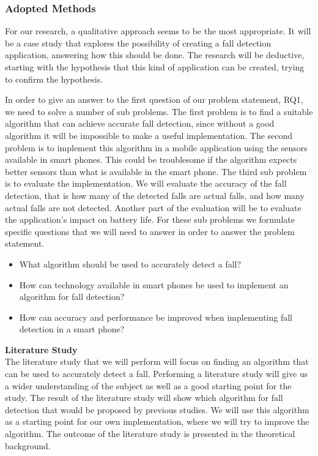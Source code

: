 \documentclass[12pt, a4paper, onecolumn]{article}
\newcommand{\parag}[1]{
	\textbf{#1} \hspace{0pt} \\
}
\begin{document}
	\subsubsection{Adopted Methods}
	
	For our research, a qualitative approach seems to be the most appropriate. It will be a case study that explores the possibility of creating a fall detection application, answering how this should be done. The research will be deductive, starting with the hypothesis that this kind of application can be created, trying to confirm the hypothesis. 
	
	In order to give an answer to the first question of our problem statement, RQ1, we need to solve a number of sub problems. The first problem is to find a suitable algorithm that can achieve accurate fall detection, since without a good algorithm it will be impossible to make a useful implementation. The second problem is to implement this algorithm in a mobile application using the sensors available in smart phones. This could be troublesome if the algorithm expects better sensors than what is available in the smart phone. The third sub problem is to evaluate the implementation. We will evaluate the accuracy of the fall detection, that is how many of the detected falls are actual falls, and how many actual falls are not detected. Another part of the evaluation will be to evaluate the application's impact on battery life. For these sub problems we formulate specific questions that we will need to answer in order to answer the problem statement.
	
	\begin{itemize}
		\item What algorithm should be used to accurately detect a fall?
		\item How can technology available in smart phones be used to implement an algorithm for fall detection?
		\item How can accuracy and performance be improved when implementing fall detection in a smart phone?
	\end{itemize}
	
	\parag{Literature Study}
	The literature study that we will perform will focus on finding an algorithm that can be used to accurately detect a fall. Performing a literature study will give us a wider understanding of the subject as well as a good starting point for the study. The result of the literature study will show which algorithm for fall detection that would be proposed by previous studies. We will use this algorithm as a starting point for our own implementation, where we will try to improve the algorithm. The outcome of the literature study is presented in the theoretical background.
	
\end{document}

